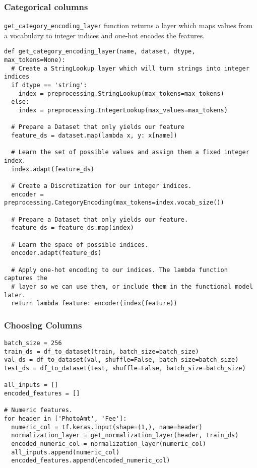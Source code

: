\begin{frame}[fragile]\frametitle{Categorical columns}
\lstinline|get_category_encoding_layer| function returns a layer which maps values from a vocabulary to integer indices and one-hot encodes the features.

\begin{lstlisting}
def get_category_encoding_layer(name, dataset, dtype, max_tokens=None):
  # Create a StringLookup layer which will turn strings into integer indices
  if dtype == 'string':
    index = preprocessing.StringLookup(max_tokens=max_tokens)
  else:
    index = preprocessing.IntegerLookup(max_values=max_tokens)

  # Prepare a Dataset that only yields our feature
  feature_ds = dataset.map(lambda x, y: x[name])

  # Learn the set of possible values and assign them a fixed integer index.
  index.adapt(feature_ds)

  # Create a Discretization for our integer indices.
  encoder = preprocessing.CategoryEncoding(max_tokens=index.vocab_size())

  # Prepare a Dataset that only yields our feature.
  feature_ds = feature_ds.map(index)

  # Learn the space of possible indices.
  encoder.adapt(feature_ds)

  # Apply one-hot encoding to our indices. The lambda function captures the
  # layer so we can use them, or include them in the functional model later.
  return lambda feature: encoder(index(feature))
\end{lstlisting}

\end{frame}

\begin{frame}[fragile]\frametitle{Choosing Columns}

\begin{lstlisting}
batch_size = 256
train_ds = df_to_dataset(train, batch_size=batch_size)
val_ds = df_to_dataset(val, shuffle=False, batch_size=batch_size)
test_ds = df_to_dataset(test, shuffle=False, batch_size=batch_size)

all_inputs = []
encoded_features = []

# Numeric features.
for header in ['PhotoAmt', 'Fee']:
  numeric_col = tf.keras.Input(shape=(1,), name=header)
  normalization_layer = get_normalization_layer(header, train_ds)
  encoded_numeric_col = normalization_layer(numeric_col)
  all_inputs.append(numeric_col)
  encoded_features.append(encoded_numeric_col)
\end{lstlisting}

\end{frame}



